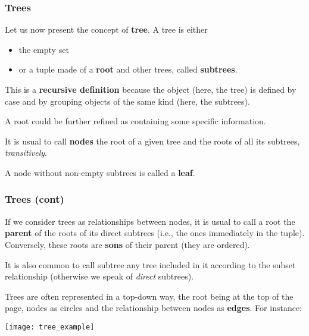 
%
\begin{frame}
\frametitle{Trees}

Let us now present the concept of \textbf{tree}. A tree is either 
\begin{itemize}

  \item the empty set

  \item or a tuple made of a \textbf{root} and other trees, called
  \textbf{subtrees}.

\end{itemize}
This is a \textbf{recursive definition} because the object (here, the
tree) is defined by case and by grouping objects of the same kind
(here, the subtrees).

\bigskip

A root could be further refined as containing some specific
information.

\bigskip

It is usual to call \textbf{nodes} the root of a given tree and the
roots of all its subtrees, \emph{transitively}.

\bigskip

A node without non-empty subtrees is called a \textbf{leaf}.

\end{frame}

%
\begin{frame}
\frametitle{Trees (cont)}

If we consider trees as relationships between nodes, it is usual to
call a root the \textbf{parent} of the roots of its direct subtrees
(i.e., the ones immediately in the tuple). Conversely, these roots are
\textbf{sons} of their parent (they are ordered).

\bigskip

It is also common to call subtree any tree included in it according to
the subset relationship (otherwise we speak of \emph{direct} subtrees).

\bigskip

Trees are often represented in a top-down way, the root being at the
top of the page, nodes as circles and the relationship between nodes
as \textbf{edges}. For instance:
\begin{center}
\texttt{[image: tree\_example]}
\end{center}

\end{frame}


